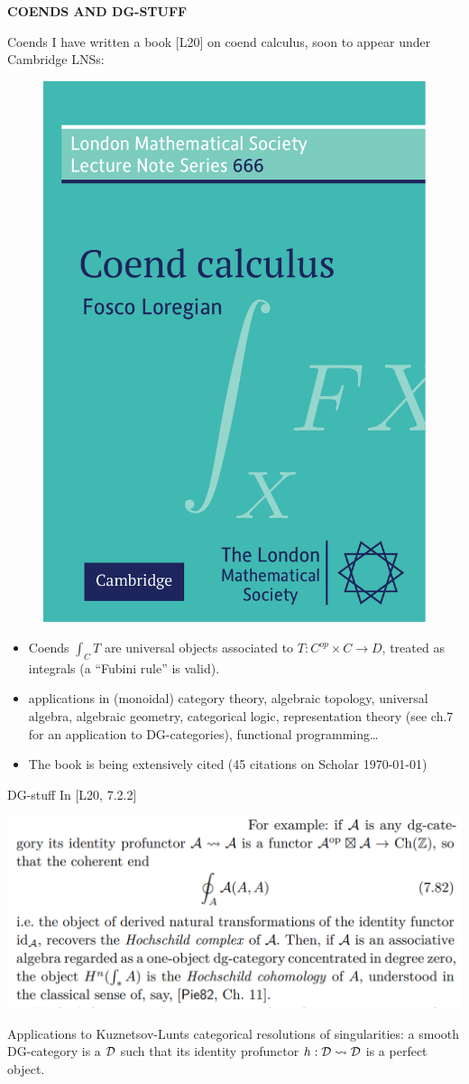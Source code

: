 \documentclass[handout]{beamer}
\def\lnk#1{\href{#1}{\faFilePdfO}}
\begin{document}
%
%
%
%
%
%
\begin{frame}
  \Huge\centering \bfseries COENDS AND DG-STUFF
\end{frame}
%
\begin{frame}{Coends}
  I have written a book [\alert{L20}\lnk{https://arxiv.org/pdf/1501.02503}] on \alert{coend calculus}, soon to appear under Cambridge LNSs:
\begin{figure}
  \includegraphics[width=.35\textwidth]{cover-2-.pdf}
\end{figure}
\small
\begin{itemize}
  \item<+-> Coends $\int_C T$ are universal objects associated to $T : C^{op}\times C \to D$, treated as integrals (a ``Fubini rule'' is valid).
  \item<+-> applications in (monoidal) category theory, algebraic topology, universal algebra, algebraic geometry, categorical logic, representation theory (see ch.7 for an application to \alert{DG-categories}), functional programming\dots
  \item<+-> The book is being extensively cited (45 citations on Scholar \today)
\end{itemize}
\end{frame}
%
%
%
%
\begin{frame}{DG-stuff}
  In [\alert{L20}\lnk{www.blank.com}, 7.2.2]
  \begin{center}
  \includegraphics[width=.75\textwidth]{dg.png}
  \end{center}
  Applications to Kuznetsov-Lunts \alert{categorical resolutions of singularities}: a smooth DG-category is a $\cal D$ such that its identity profunctor $h : {\cal D} \rightsquigarrow \cal D$ is a perfect object.%
\end{frame}
\end{document}
